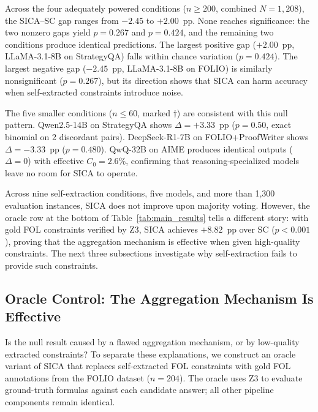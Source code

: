 Across the four adequately powered conditions ($n \geq 200$, combined $N = 1{,}208$), the SICA--SC gap ranges from $-2.45$ to $+2.00$~pp. None reaches significance: the two nonzero gaps yield $p = 0.267$ and $p = 0.424$, and the remaining two conditions produce identical predictions. The largest positive gap ($+2.00$~pp, LLaMA-3.1-8B on StrategyQA) falls within chance variation ($p = 0.424$). The largest negative gap ($-2.45$~pp, LLaMA-3.1-8B on FOLIO) is similarly nonsignificant ($p = 0.267$), but its direction shows that SICA can harm accuracy when self-extracted constraints introduce noise.

The five smaller conditions ($n \leq 60$, marked $\dagger$) are consistent with this null pattern. Qwen2.5-14B on StrategyQA shows $\Delta = +3.33$~pp ($p = 0.50$, exact binomial on 2 discordant pairs). DeepSeek-R1-7B on FOLIO+ProofWriter shows $\Delta = -3.33$~pp ($p = 0.480$). QwQ-32B on AIME produces identical outputs ($\Delta = 0$) with effective $C_0 = 2.6\%$, confirming that reasoning-specialized models leave no room for SICA to operate.

Across nine self-extraction conditions, five models, and more than 1,300 evaluation instances, SICA does not improve upon majority voting. However, the oracle row at the bottom of Table~\ref{tab:main_results} tells a different story: with gold FOL constraints verified by Z3, SICA achieves $+8.82$~pp over SC ($p < 0.001$), proving that the aggregation mechanism is effective when given high-quality constraints. The next three subsections investigate why self-extraction fails to provide such constraints.


\subsection{Oracle Control: The Aggregation Mechanism Is Effective}
\label{sec:oracle}

Is the null result caused by a flawed aggregation mechanism, or by low-quality extracted constraints? To separate these explanations, we construct an oracle variant of SICA that replaces self-extracted FOL constraints with gold FOL annotations from the FOLIO dataset ($n = 204$). The oracle uses Z3 to evaluate ground-truth formulas against each candidate answer; all other pipeline components remain identical.

